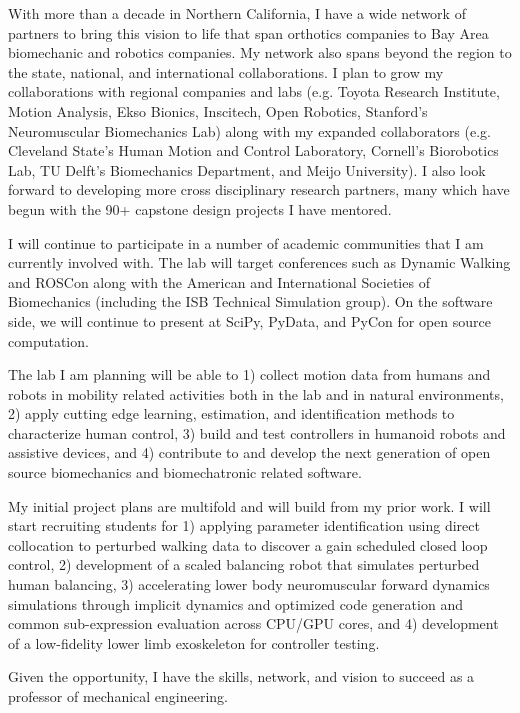 \documentclass{article}
\begin{document}
With more than a decade in Northern California, I have a wide network of
partners to bring this vision to life that span orthotics companies to Bay Area
biomechanic and robotics companies. My network also spans beyond the region to
the state, national, and international collaborations. I plan to grow my
collaborations with regional companies and labs (e.g. Toyota Research
Institute, Motion Analysis, Ekso Bionics, Inscitech, Open Robotics, Stanford's
Neuromuscular Biomechanics Lab) along with my expanded collaborators (e.g.
Cleveland State's Human Motion and Control Laboratory, Cornell's Biorobotics
Lab, TU Delft's Biomechanics Department, and Meijo University). I also look
forward to developing more cross disciplinary research partners, many which
have begun with the 90+ capstone design projects I have mentored.

I will continue to participate in a number of academic communities that I am
currently involved with. The lab will target conferences such as Dynamic
Walking and ROSCon along with the American and International Societies of
Biomechanics (including the ISB Technical Simulation group). On the software
side, we will continue to present at SciPy, PyData, and PyCon for open source
computation.

The lab I am planning will be able to 1) collect motion data from humans and
robots in mobility related activities both in the lab and in natural
environments, 2) apply cutting edge learning, estimation, and identification
methods to characterize human control, 3) build and test controllers in
humanoid robots and assistive devices, and 4) contribute to and develop the
next generation of open source biomechanics and biomechatronic related
software.

My initial project plans are multifold and will build from my prior work. I
will start recruiting students for 1) applying parameter identification using
direct collocation to perturbed walking data to discover a gain scheduled
closed loop control, 2) development of a scaled balancing robot that simulates
perturbed human balancing, 3) accelerating lower body neuromuscular forward
dynamics simulations through implicit dynamics and optimized code generation
and common sub-expression evaluation across CPU/GPU cores, and 4) development
of a low-fidelity lower limb exoskeleton for controller testing.

Given the opportunity, I have the skills, network, and vision to succeed as a
professor of mechanical engineering.



\end{document}

